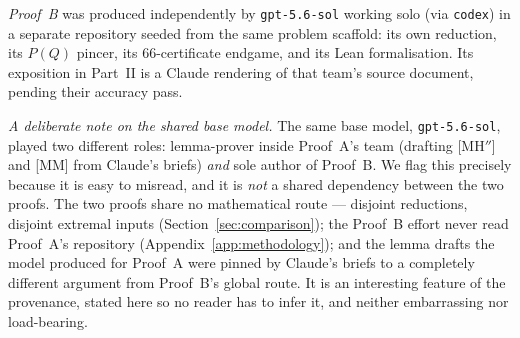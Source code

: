 \documentclass[11pt,reqno]{amsart}
\theoremstyle{definition}
\theoremstyle{remark}
\begin{document}
\emph{Proof~B} was produced independently by \texttt{gpt-5.6-sol} working solo (via
\texttt{codex}) in a separate repository seeded from the same problem scaffold: its own
reduction, its $P(Q)$ pincer, its $66$-certificate endgame, and its Lean formalisation.
Its exposition in Part~II is a Claude rendering of that team's source document, pending
their accuracy pass.

\emph{A deliberate note on the shared base model.} The same base model,
\texttt{gpt-5.6-sol}, played two different roles: lemma-prover inside Proof~A's team
(drafting \textsf{[MH$''$]} and \textsf{[MM]} from Claude's briefs) \emph{and} sole author
of Proof~B. We flag this precisely because it is easy to misread, and it is \emph{not} a
shared dependency between the two proofs. The two proofs share no mathematical route ---
disjoint reductions, disjoint extremal inputs (Section~\ref{sec:comparison}); the Proof~B
effort never read Proof~A's repository (Appendix~\ref{app:methodology}); and the lemma
drafts the model produced for Proof~A were pinned by Claude's briefs to a completely
different argument from Proof~B's global route. It is an interesting feature of the
provenance, stated here so no reader has to infer it, and neither embarrassing nor
load-bearing.
\end{document}
